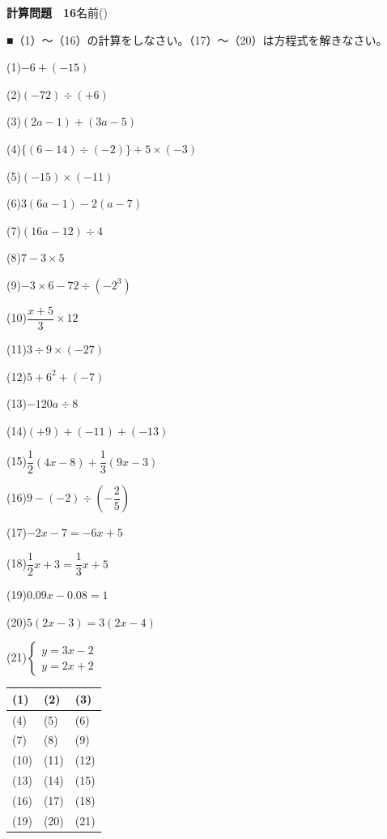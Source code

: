 \documentclass[a4paper,11pt]{ltjsarticle}
\newlength{\qcol}\setlength{\qcol}{0.47\textwidth}
\newlength{\qgap}
\newlength{\anscolw}\setlength{\anscolw}{0.30\textwidth}
\newlength{\ansh}
\newcommand{\Q}[2]{\parbox[t]{\qcol}{\raggedright (#1)\hspace{0.6em}$\displaystyle #2$}}
\newcommand{\QR}[4]{\Q{#1}{#2}\hfill\Q{#3}{#4}\par\vspace{\qgap}}
\newcommand{\anscell}[1]{\rule[-\ansdrop]{0pt}{\ansh}(#1)}
\newlength{\ansdrop}
\begin{document}
{\large\bfseries 計算問題　16}\hfill 名前(\underline{\hspace{32mm}})\par\vspace{3mm}
■（1）〜（16）の計算をしなさい。（17）〜（20）は方程式を解きなさい。\par\vspace{3mm}
\setlength{\qgap}{5.4mm}
\QR{1}{-6+(-15)}{2}{(-72)\div(+6)}
\QR{3}{(2a-1)+(3a-5)}{4}{\{(6-14)\div(-2)\}+5\times(-3)}
\QR{5}{(-15)\times(-11)}{6}{3(6a-1)-2(a-7)}
\QR{7}{(16a-12)\div4}{8}{7-3\times5}
\QR{9}{-3\times6-72\div(-2^3)}{10}{\dfrac{x+5}{3}\times12}
\QR{11}{3\div9\times(-27)}{12}{5+6^2+(-7)}
\QR{13}{-120a\div8}{14}{(+9)+(-11)+(-13)}
\QR{15}{\dfrac{1}{2}(4x-8)+\dfrac{1}{3}(9x-3)}{16}{9-(-2)\div\left(-\dfrac{2}{5}\right)}
\QR{17}{-2x-7=-6x+5}{18}{\dfrac{1}{2}x+3=\dfrac{1}{3}x+5}
\QR{19}{0.09x-0.08=1}{20}{5(2x-3)=3(2x-4)}
\vspace{1mm}
\Q{21}{\left\{\begin{array}{l} y=3x-2 \\ y=2x+2 \end{array}\right.}\par\vspace{3mm}
\setlength{\ansh}{9.5mm}\setlength{\ansdrop}{6mm}%
\begin{center}\begin{tabular}{|p{\anscolw}|p{\anscolw}|p{\anscolw}|}\hline
\anscell{1} & \anscell{2} & \anscell{3} \\\hline
\anscell{4} & \anscell{5} & \anscell{6} \\\hline
\anscell{7} & \anscell{8} & \anscell{9} \\\hline
\anscell{10} & \anscell{11} & \anscell{12} \\\hline
\anscell{13} & \anscell{14} & \anscell{15} \\\hline
\anscell{16} & \anscell{17} & \anscell{18} \\\hline
\anscell{19} & \anscell{20} & \anscell{21} \\\hline
\end{tabular}\end{center}
\end{document}
